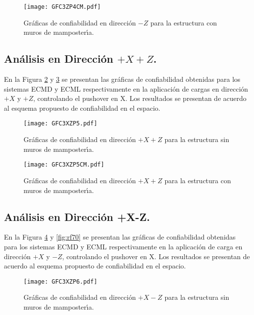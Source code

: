 \begin{figure} [htbp]
\centering
\texttt{[image: GFC3ZP4CM.pdf]}
\caption{Gr\'aficas de confiabilidad en direcci\'on $-Z$ para la estructura con muros de mamposter\'{\i}a.}
\label{fig:rf54}
\end{figure}

\newpage

\subsection{An\'alisis en Direcci\'on $+X+Z$.}

En la Figura \ref{fig:rf63} y \ref{fig:rf64} se presentan las gr\'aficas de confiabilidad obtenidas para los sistemas ECMD y ECML respectivamente en la aplicaci\'on de cargas en direcci\'on $+X$ y $+Z$, controlando el pushover en X. Los resultados se presentan de acuerdo al esquema propuesto de confiabilidad en el espacio.

\begin{figure} [htbp]
\centering
\texttt{[image: GFC3XZP5.pdf]}
\caption{Gr\'aficas de confiabilidad en direcci\'on $+X+Z$ para la estructura sin muros de mamposter\'{\i}a.}
\label{fig:rf63}
\end{figure}

\begin{figure} [htbp]
\centering
\texttt{[image: GFC3XZP5CM.pdf]}
\caption{Gr\'aficas de confiabilidad en direcci\'on $+X+Z$ para la estructura con muros de mamposter\'{\i}a.}
\label{fig:rf64}
\end{figure}

\newpage

\subsection{An\'alisis en Direcci\'on +X-Z.}

En la Figura \ref{fig:rf69} y \ref{fig:rf70} se presentan las gr\'aficas de confiabilidad obtenidas para los sistemas ECMD y ECML respectivamente en la aplicaci\'on de carga en direcci\'on $+X$ y $-Z$, controlando el pushover en X. Los resultados se presentan de acuerdo al esquema propuesto de confiabilidad en el espacio.

\begin{figure} [htbp]
\centering
\texttt{[image: GFC3XZP6.pdf]}
\caption{Gr\'aficas de confiabilidad en direcci\'on $+X-Z$ para la estructura sin muros de mamposter\'{\i}a.}
\label{fig:rf69}
\end{figure}

